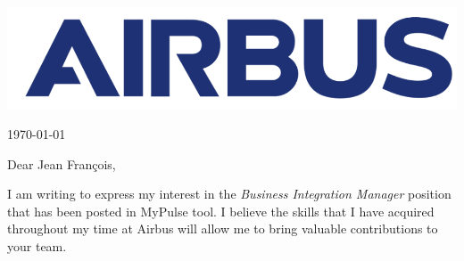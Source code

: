 \documentclass[11pt,a4paper]{letter}
\begin{document}
\thispagestyle{empty}

\vspace{0pt}

\begin{center}
\includegraphics[scale=0.1]{Images/airbus_blue_logo.png}
\end{center}
\vspace{20pt}

\hspace*{\fill} \longdate\today 


\vspace{10pt}



Dear Jean Fran\c cois,

\vspace{10pt}

I am writing to express my interest in the \textit{Business Integration Manager} position that has been posted in MyPulse tool. I believe the skills that I have acquired throughout my time at Airbus will allow me to bring valuable contributions to your team.
\end{document}

